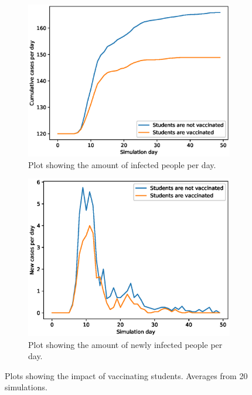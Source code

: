 \documentclass[runningheads]{llncs}
\begin{document}
\begin{figure}[h!]
	\centering
	\begin{subfigure}[b]{0.7\linewidth}
		\includegraphics[width=\textwidth]{2_2_Vaccinating/vaccinating_cases_cum_20runs.eps}
		\caption{Plot showing the amount of infected people per day.} 	
	\end{subfigure}
	\begin{subfigure}[b]{0.7\linewidth}
		\includegraphics[width=\textwidth]{2_2_Vaccinating/vaccinating_cases_per_day_20runs.eps}
		\caption{Plot showing the amount of newly infected people per day.} 
	\end{subfigure}
	\caption{Plots showing the impact of vaccinating students. Averages from 20 simulations.}
	\label{VaccinePlot}
\end{figure}
\end{document}
